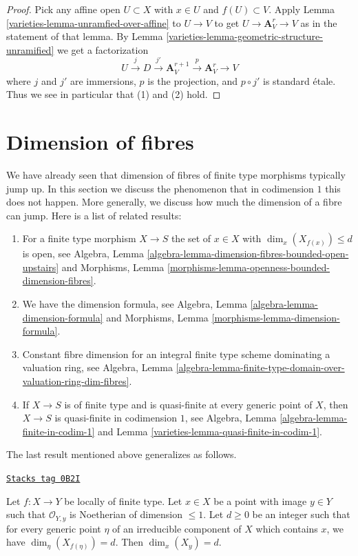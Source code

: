 \begin{proof}

Pick any affine open $U \subset X$ with $x \in U$ and $f(U) \subset V$.
Apply Lemma \ref{varieties-lemma-unramfied-over-affine} to $U \to V$ to
get $U \to \mathbf{A}^r_V \to V$ as in the statement of that lemma.
By Lemma \ref{varieties-lemma-geometric-structure-unramified}
we get a factorization
$$
U \xrightarrow{j} D \xrightarrow{j'} \mathbf{A}^{r + 1}_V
\xrightarrow{p} \mathbf{A}^r_V \to V
$$
where $j$ and $j'$ are immersions, $p$ is the projection, and
$p \circ j'$ is standard \'etale. Thus we see in particular that
(1) and (2) hold.
\end{proof}

\section{Dimension of fibres}
\label{varieties-section-dimension-fibres}
We have already seen that dimension of fibres of finite type morphisms
typically jump up. In this section we discuss the phenomenon that in
codimension $1$ this does not happen. More generally, we discuss how
much the dimension of a fibre can jump. Here is a list of related results:
\begin{enumerate}
\item For a finite type morphism $X \to S$ the set of
$x \in X$ with $\dim_x(X_{f(x)}) \leq d$ is open, see
Algebra, Lemma \ref{algebra-lemma-dimension-fibres-bounded-open-upstairs}
and
Morphisms, Lemma \ref{morphisms-lemma-openness-bounded-dimension-fibres}.
\item We have the dimension formula, see
Algebra, Lemma \ref{algebra-lemma-dimension-formula} and
Morphisms, Lemma \ref{morphisms-lemma-dimension-formula}.
\item Constant fibre dimension for an integral finite type scheme
dominating a valuation ring, see Algebra, Lemma
\ref{algebra-lemma-finite-type-domain-over-valuation-ring-dim-fibres}.
\item If $X \to S$ is of finite type and is quasi-finite at every
generic point of $X$, then $X \to S$ is quasi-finite in codimension $1$, see
Algebra, Lemma \ref{algebra-lemma-finite-in-codim-1} and
Lemma \ref{varieties-lemma-quasi-finite-in-codim-1}.
\end{enumerate}
The last result mentioned above generalizes as follows.

\begin{lemma}
\label{varieties-lemma-dimension-fibre-in-codim-1}
\href{https://stacks.math.columbia.edu/tag/0B2I}{\texttt{Stacks tag 0B2I}}

Let $f : X \to Y$ be locally of finite type. Let $x \in X$ be a point
with image $y \in Y$ such that $\mathcal{O}_{Y, y}$ is Noetherian of
dimension $\leq 1$. Let $d \geq 0$ be an integer such that for every
generic point $\eta$ of an irreducible component of $X$ which contains
$x$, we have $\dim_\eta(X_{f(\eta)}) = d$. Then $\dim_x(X_y) = d$.
\end{lemma}

